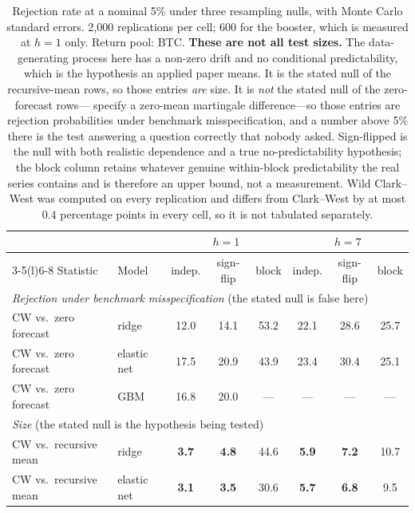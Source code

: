 \documentclass{article}
\theoremstyle{plain}
\theoremstyle{definition}
\begin{document}
\begin{table}[t]
  \centering
  \caption{Rejection rate at a nominal 5\% under three resampling nulls, with Monte
  Carlo standard errors. 2{,}000 replications per cell; 600 for the booster, which
  is measured at $h=1$ only. Return pool: BTC. \textbf{These are not all test sizes.}
  The data-generating process here has a non-zero drift and no conditional predictability,
  which is the hypothesis an applied paper means. It is the stated null of the
  recursive-mean rows, so those entries \emph{are} size. It is \emph{not} the stated null of
  the zero-forecast rows---\citet{clark2006} specify a zero-mean martingale difference---so
  those entries are rejection probabilities under benchmark misspecification, and a number
  above 5\% there is the test answering a question correctly that nobody asked. Sign-flipped
  is the null with both realistic dependence and a true no-predictability hypothesis; the
  block column retains whatever genuine within-block predictability the real series contains
  and is therefore an upper bound, not a measurement. Wild Clark--West was computed on every
  replication and differs from Clark--West by at most $0.4$ percentage points in every cell,
  so it is not tabulated separately.}
  \label{tab:size}
  \small
  \setlength{\tabcolsep}{4pt}
  \begin{tabular}{llccc@{\qquad}ccc}
    \toprule
    & & \multicolumn{3}{c}{$h = 1$} & \multicolumn{3}{c}{$h = 7$} \\
    \cmidrule(lr){3-5}\cmidrule(l){6-8}
    Statistic & Model & indep. & sign-flip & block & indep. & sign-flip & block \\
    \midrule
    \multicolumn{8}{l}{\emph{Rejection under benchmark misspecification} (the stated null is false here)} \\
    CW vs.\ zero forecast  & ridge       & 12.0 & 14.1 & 53.2 & 22.1 & 28.6 & 25.7 \\
    CW vs.\ zero forecast  & elastic net & 17.5 & 20.9 & 43.9 & 23.4 & 30.4 & 25.1 \\
    CW vs.\ zero forecast  & GBM         & 16.8 & 20.0 & ---  & ---  & ---  & ---  \\
    \midrule
    \multicolumn{8}{l}{\emph{Size} (the stated null is the hypothesis being tested)} \\
    CW vs.\ recursive mean & ridge       & \textbf{3.7} & \textbf{4.8} & 44.6 & \textbf{5.9} & \textbf{7.2} & 10.7 \\
    CW vs.\ recursive mean & elastic net & \textbf{3.1} & \textbf{3.5} & 30.6 & \textbf{5.7} & \textbf{6.8} & 9.5 \\

\end{tabular}
\end{table}
\end{document}
